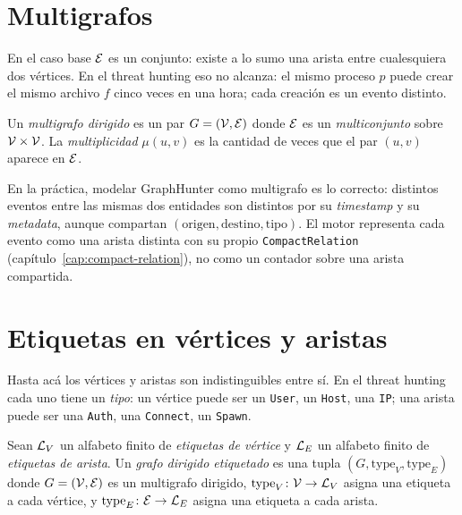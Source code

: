 \section{Multigrafos}

En el caso base \(\mathcal{E}\) es un conjunto: existe a lo sumo una arista
entre cualesquiera dos vértices. En el threat hunting eso no alcanza:
el mismo proceso \(p\) puede crear el mismo archivo \(f\) cinco veces
en una hora; cada creación es un evento distinto.

\begin{definition}
Un \emph{multigrafo dirigido} es un par \(G = (\mathcal{V}, \mathcal{E})\) donde \(\mathcal{E}\)
es un \emph{multiconjunto} sobre \(\mathcal{V} \times \mathcal{V}\). La
\emph{multiplicidad} \(\mu(u, v)\) es la cantidad de veces que el par
\((u, v)\) aparece en \(\mathcal{E}\).
\end{definition}

\begin{nota}
En la práctica, modelar GraphHunter como multigrafo es lo correcto:
distintos eventos entre las mismas dos entidades son distintos por
su \emph{timestamp} y su \emph{metadata}, aunque compartan
\((\text{origen}, \text{destino}, \text{tipo})\). El motor representa
cada evento como una arista distinta con su propio
\texttt{CompactRelation} (capítulo~\ref{cap:compact-relation}), no
como un contador sobre una arista compartida.
\end{nota}

\section{Etiquetas en vértices y aristas}

Hasta acá los vértices y aristas son indistinguibles entre sí. En el
threat hunting cada uno tiene un \emph{tipo}: un vértice puede ser un
\texttt{User}, un \texttt{Host}, una \texttt{IP}; una arista puede
ser una \texttt{Auth}, una \texttt{Connect}, un \texttt{Spawn}.

\begin{definition}
Sean \(\mathcal{L}_V\) un alfabeto finito de \emph{etiquetas de vértice} y
\(\mathcal{L}_E\) un alfabeto finito de \emph{etiquetas de arista}. Un
\emph{grafo dirigido etiquetado} es una tupla
\((G, \mathrm{type}_V, \mathrm{type}_E)\) donde \(G = (\mathcal{V}, \mathcal{E})\) es un
multigrafo dirigido,
\(\mathrm{type}_V \colon \mathcal{V} \to \mathcal{L}_V\) asigna una etiqueta a cada
vértice, y
\(\mathrm{type}_E \colon \mathcal{E} \to \mathcal{L}_E\) asigna una etiqueta a cada
arista.
\end{definition}


